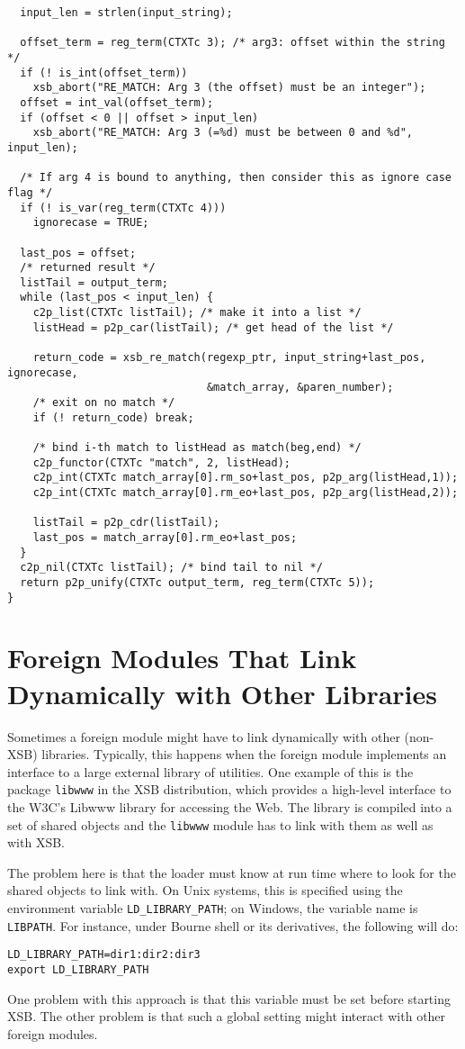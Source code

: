 {\begin{verbatim}
  input_len = strlen(input_string);
  
  offset_term = reg_term(CTXTc 3); /* arg3: offset within the string */
  if (! is_int(offset_term))
    xsb_abort("RE_MATCH: Arg 3 (the offset) must be an integer");
  offset = int_val(offset_term);
  if (offset < 0 || offset > input_len)
    xsb_abort("RE_MATCH: Arg 3 (=%d) must be between 0 and %d", input_len);

  /* If arg 4 is bound to anything, then consider this as ignore case flag */
  if (! is_var(reg_term(CTXTc 4)))
    ignorecase = TRUE;

  last_pos = offset;
  /* returned result */
  listTail = output_term;
  while (last_pos < input_len) {
    c2p_list(CTXTc listTail); /* make it into a list */
    listHead = p2p_car(listTail); /* get head of the list */

    return_code = xsb_re_match(regexp_ptr, input_string+last_pos, ignorecase,
                               &match_array, &paren_number);
    /* exit on no match */
    if (! return_code) break;

    /* bind i-th match to listHead as match(beg,end) */
    c2p_functor(CTXTc "match", 2, listHead);
    c2p_int(CTXTc match_array[0].rm_so+last_pos, p2p_arg(listHead,1));
    c2p_int(CTXTc match_array[0].rm_eo+last_pos, p2p_arg(listHead,2));

    listTail = p2p_cdr(listTail);
    last_pos = match_array[0].rm_eo+last_pos;
  }
  c2p_nil(CTXTc listTail); /* bind tail to nil */
  return p2p_unify(CTXTc output_term, reg_term(CTXTc 5));
}
\end{verbatim}
}

\section{Foreign Modules That Link Dynamically with Other Libraries}

Sometimes a foreign module might have to link dynamically with other
(non-XSB) libraries. Typically, this happens when the foreign module
implements an interface to a large external library of utilities.
One example of this is the package {\tt libwww} in the XSB distribution,
which provides a high-level interface to the W3C's Libwww library for
accessing the Web. The library is compiled into a set of shared objects and
the {\tt libwww} module has to link with them as well as with XSB.

The problem here is that the loader must know at run time where to look for
the shared objects to link with. On Unix systems, this is specified using
the environment variable {\tt LD\_LIBRARY\_PATH}; on Windows, the variable
name is {\tt LIBPATH}. For instance, 
under Bourne shell or its derivatives, the following will do:
\begin{verbatim}
LD_LIBRARY_PATH=dir1:dir2:dir3
export LD_LIBRARY_PATH
\end{verbatim}
One problem with this approach is that this variable must be set before
starting XSB. The other problem is that such a global setting might
interact with other foreign modules.

